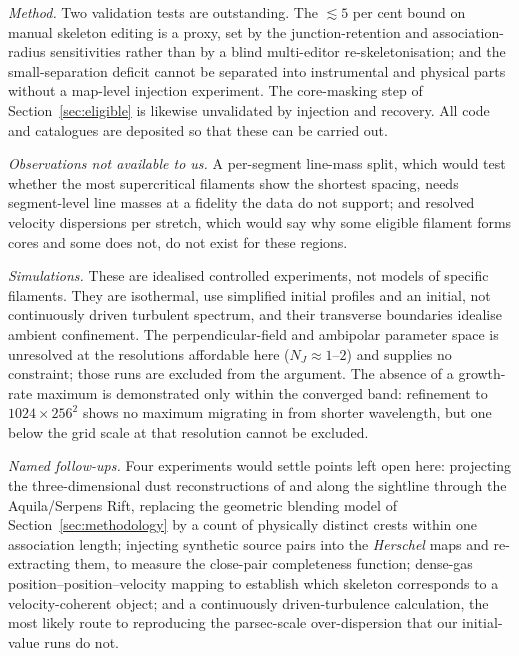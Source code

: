 \documentclass[usenatbib,twoside,twocolumn]{mnras}
\begin{document}
\emph{Method.} Two validation tests are outstanding. The $\lesssim5$ per cent bound on manual skeleton editing is a proxy, set by the junction-retention and association-radius sensitivities rather than by a blind multi-editor re-skeletonisation; and the small-separation deficit cannot be separated into instrumental and physical parts without a map-level injection experiment. The core-masking step of Section~\ref{sec:eligible} is likewise unvalidated by injection and recovery. All code and catalogues are deposited so that these can be carried out.

\emph{Observations not available to us.} A per-segment line-mass split, which would test whether the most supercritical filaments show the shortest spacing, needs segment-level line masses at a fidelity the data do not support; and resolved velocity dispersions per stretch, which would say why some eligible filament forms cores and some does not, do not exist for these regions.

\emph{Simulations.} These are idealised controlled experiments, not models of specific filaments. They are isothermal, use simplified initial profiles and an initial, not continuously driven turbulent spectrum, and their transverse boundaries idealise ambient confinement. The perpendicular-field and ambipolar parameter space is unresolved at the resolutions affordable here ($N_J\approx1$--$2$) and supplies no constraint; those runs are excluded from the argument. The absence of a growth-rate maximum is demonstrated only within the converged band: refinement to $1024\times256^2$ shows no maximum migrating in from shorter wavelength, but one below the grid scale at that resolution cannot be excluded.

\smallskip\noindent\emph{Named follow-ups.} Four experiments would settle points left open here: projecting the three-dimensional dust reconstructions of \citet{Zucker2020} and \citet{Green2024} along the sightline through the Aquila/Serpens Rift, replacing the geometric blending model of Section~\ref{sec:methodology} by a count of physically distinct crests within one association length; injecting synthetic source pairs into the \textit{Herschel} maps and re-extracting them, to measure the close-pair completeness function; dense-gas position--position--velocity mapping to establish which skeleton corresponds to a velocity-coherent object; and a continuously driven-turbulence calculation, the most likely route to reproducing the parsec-scale over-dispersion that our initial-value runs do not.
\end{document}
